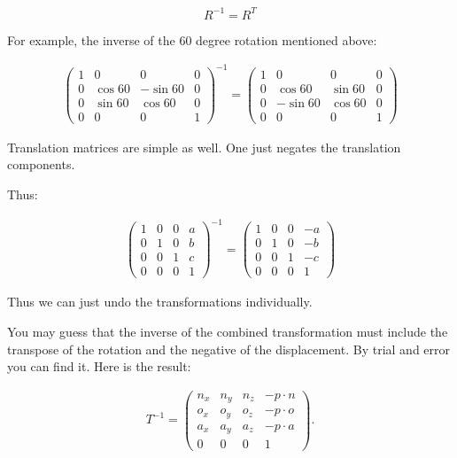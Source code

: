 \[R^{-1} = R^T\]

For example, the inverse of the 60 degree rotation mentioned above:

\[\begin{aligned}
\begin{pmatrix}1 & 0 & 0 & 0 \\ 0 & \cos 60 & -\sin 60 & 0  \\
         0& \sin 60 & \cos 60 & 0 \\
         0& 0& 0& 1 \end{pmatrix}^{-1} =
         \begin{pmatrix}1 & 0 & 0 & 0 \\ 0 & \cos 60 & \sin 60 & 0  \\
         0& -\sin 60 & \cos 60 & 0 \\
         0& 0& 0& 1 \end{pmatrix}
\end{aligned}\]

Translation matrices are simple as well. One just negates the
translation components.

Thus:

\[\begin{aligned}
\begin{pmatrix}1 & 0 & 0 & a \\ 0 & 1 & 0 & b  \\
         0& 0 & 1 & c \\
         0& 0& 0& 1 \end{pmatrix}^{-1} =
         \begin{pmatrix}1 & 0 & 0 & -a \\ 0 & 1 & 0 & -b  \\
         0& 0 & 1 & -c \\
         0& 0& 0& 1 \end{pmatrix}
\end{aligned}\]

Thus we can just undo the transformations individually.

You may guess that the inverse of the combined transformation must
include the transpose of the rotation and the negative of the
displacement. By trial and error you can find it. Here is the result:

\[\begin{aligned}
T^{-1} =  \begin{pmatrix}
         n_x & n_y & n_z & -p\cdot n \\
         o_x & o_y & o_z & -p\cdot o\\
         a_x & a_y & a_z & -p\cdot a \\
         0  &  0  &  0 & 1 \end{pmatrix}.
\end{aligned}\]

